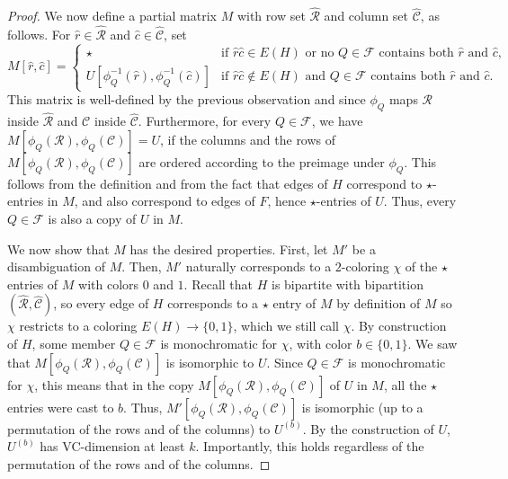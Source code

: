 \documentclass[11pt]{article}
\theoremstyle{remark}
\begin{document}
\begin{proof}
    We now define a partial matrix $M$ with row set $\widehat{\mathcal{R}}$ and column set $\widehat{\mathcal{C}}$, as follows. 
    For $\widehat{r} \in \widehat{\mathcal{R}}$ and $\widehat{c} \in \widehat{\mathcal{C}}$, set
    \[M[\widehat{r}, \widehat{c}] = \begin{cases}
      \star &\text{if $\widehat{r}\widehat{c} \in E(H)$ or no $Q \in \mathcal{F}$ contains both $\widehat{r}$ and $\widehat{c}$,} \\
      U[\phi_Q^{-1}(\widehat{r}), \phi_Q^{-1}(\widehat{c})] &\text{if $\widehat{r}\widehat{c} \notin E(H)$ and $Q \in \mathcal{F}$ contains both $\widehat{r}$ and $\widehat{c}$.}
    \end{cases}\]
    This matrix is well-defined by the previous observation and since $\phi_Q$ maps $\mathcal{R}$ inside $\widehat{\mathcal{R}}$ and $\mathcal{C}$ inside $\widehat{\mathcal{C}}$.
    Furthermore, for every $Q \in \mathcal{F}$, we have $M[\phi_Q(\mathcal{R}), \phi_Q(\mathcal{C})] = U$, if the columns and the rows of $M[\phi_Q(\mathcal{R}), \phi_Q(\mathcal{C})]$ are ordered according to the preimage under $\phi_Q$. This follows from the definition and from the fact that edges of $H$ correspond to $\star$-entries in $M$, and also correspond to edges of $F$, hence $\star$-entries of $U$.
    Thus, every $Q \in \mathcal{F}$ is also a copy of $U$ in $M$.
    
    We now show that $M$ has the desired properties.
    First, let $M'$ be a disambiguation of $M$.
    Then, $M'$ naturally corresponds to a $2$-coloring $\chi$ of the $\star$ entries of $M$ with colors $0$ and $1$.
    Recall that $H$ is bipartite with bipartition $(\widehat{\mathcal{R}}, \widehat{\mathcal{C}})$, so every edge of $H$ corresponds to a $\star$ entry of $M$ by definition of $M$ so $\chi$ restricts to a coloring $E(H) \to \{0, 1\}$, which we still call $\chi$.
    By construction of $H$, some member $Q \in \mathcal{F}$ is monochromatic for $\chi$, with color $b \in \{0, 1\}$.
    We saw that $M[\phi_Q(\mathcal{R}),\phi_Q(\mathcal{C})]$ is isomorphic to $U$.
    Since $Q \in \mathcal{F}$ is monochromatic for $\chi$, this means that in the copy $M[\phi_Q(\mathcal{R}),\phi_Q(\mathcal{C})]$ of $U$ in $M$, all the $\star$ entries were cast to $b$.
    Thus, $M'[\phi_Q(\mathcal{R}),\phi_Q(\mathcal{C})]$ is isomorphic (up to a permutation of the rows and of the columns) to $U^{(b)}$.
    By the construction of $U$, $U^{(b)}$ has VC-dimension at least $k$.
    Importantly, this holds regardless of the permutation of the rows and of the columns.
    

\end{proof}
\end{document}
